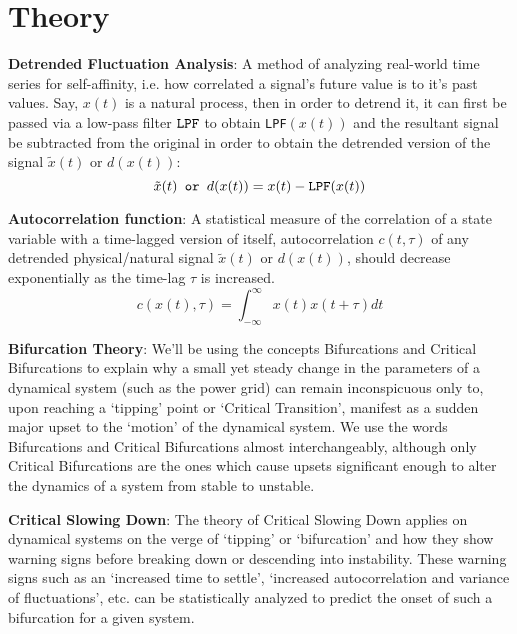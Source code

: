 \section[Theory]{Theory}
\label{sec:theory}

\textbf{Detrended Fluctuation Analysis}: A method of analyzing real-world time series for self-affinity, i.e. how correlated a signal's future value is to it's past values. Say, $x(t)$ is a natural process, then in order to detrend it, it can first be passed via a low-pass filter $\verb|LPF|$ to obtain \verb|LPF|$(x(t))$ and the resultant signal be subtracted from the original in order to obtain the detrended version of the signal $\tilde{x}(t)$ or $d(x(t))$:
\begin{equation}
	\tilde{x}(t) \verb| or | d(x(t)) = x(t) - \verb|LPF|(x(t))
\end{equation}

\textbf{Autocorrelation function}: A statistical measure of the correlation of a state variable with a time-lagged version of itself, autocorrelation $c(t, \tau)$ of any detrended physical/natural signal $\tilde{x}(t)$ or $d(x(t))$, should decrease exponentially as the time-lag $\tau$ is increased.
\begin{equation}
	c(x(t), \tau) = \int_{-\infty}^{\infty}x(t)x(t+\tau)dt  
\end{equation}

\textbf{Bifurcation Theory}: We'll be using the concepts Bifurcations and Critical Bifurcations to explain why a small yet steady change in the parameters of a dynamical system (such as the power grid) can remain inconspicuous only to, upon reaching a `tipping' point or `Critical Transition', manifest as a sudden major upset to the `motion' of the dynamical system. We use the words Bifurcations and Critical Bifurcations almost interchangeably, although only Critical Bifurcations are the ones which cause upsets significant enough to alter the dynamics of a system from stable to unstable.

\textbf{Critical Slowing Down}: The theory of Critical Slowing Down applies on dynamical systems on the verge of `tipping' or `bifurcation' and how they show warning signs before breaking down or descending into instability. These warning signs such as an `increased time to settle', `increased autocorrelation and variance of fluctuations', etc. \cite{schefferEarlyWarningSignalsForCriticalTransitions} can be statistically analyzed to predict the onset of such a bifurcation for a given system.


